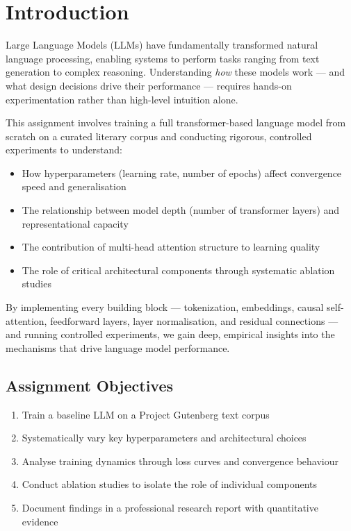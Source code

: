 \documentclass[12pt,a4paper]{article}
\begin{document}
\newpage
\section{Introduction}

Large Language Models (LLMs) have fundamentally transformed natural language processing, enabling systems to perform tasks ranging from text generation to complex reasoning. Understanding \textit{how} these models work — and what design decisions drive their performance — requires hands-on experimentation rather than high-level intuition alone.

This assignment involves training a full transformer-based language model from scratch on a curated literary corpus and conducting rigorous, controlled experiments to understand:

\begin{itemize}[leftmargin=1.8cm]
  \item How hyperparameters (learning rate, number of epochs) affect convergence speed and generalisation
  \item The relationship between model depth (number of transformer layers) and representational capacity
  \item The contribution of multi-head attention structure to learning quality
  \item The role of critical architectural components through systematic ablation studies
\end{itemize}

By implementing every building block — tokenization, embeddings, causal self-attention, feedforward layers, layer normalisation, and residual connections — and running controlled experiments, we gain deep, empirical insights into the mechanisms that drive language model performance.

\subsection{Assignment Objectives}

\begin{enumerate}[leftmargin=2cm]
  \item Train a baseline LLM on a Project Gutenberg text corpus
  \item Systematically vary key hyperparameters and architectural choices
  \item Analyse training dynamics through loss curves and convergence behaviour
  \item Conduct ablation studies to isolate the role of individual components
  \item Document findings in a professional research report with quantitative evidence
\end{enumerate}
\end{document}
